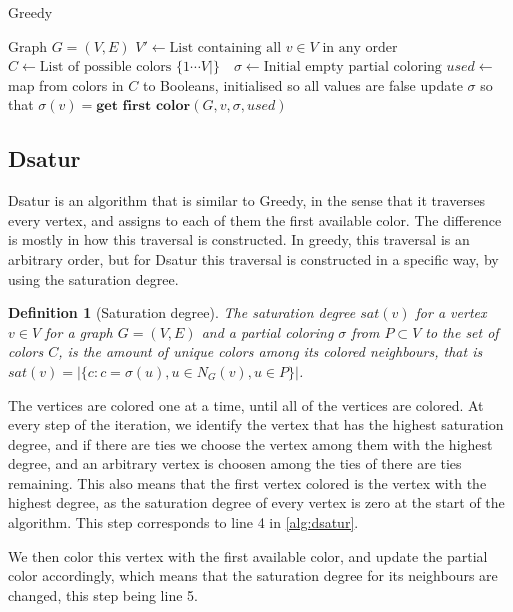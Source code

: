 \documentclass[a4paper]{article}
\newtheorem{definition}{Definition}[section]
\begin{document}
\begin{algorithm}[H]
  \caption{Greedy}
  \label{alg:greedy}
  \begin{algorithmic}[1]
      \REQUIRE Graph $G = (V,E)$
      \STATE $V' \leftarrow \text{List containing all $v \in V$ in any order}$
      \STATE $C \leftarrow \text{List of possible colors $\{1 \cdots V| \}$ }$
      \STATE $\sigma \leftarrow \text{Initial empty partial coloring}$
      \STATE $used \leftarrow $ map from colors in $C$ to Booleans, initialised
      so all values are false
        \STATE update $\sigma$ so that  $\sigma(v) = \textbf{get first color}(G,v,\sigma,used)$
    \ENDFOR
  \end{algorithmic}
\end{algorithm}

\subsection{Dsatur}

Dsatur is an algorithm that is similar to Greedy, in the sense that it
traverses every vertex, and assigns to each of them the first available color.
The difference is mostly in how this traversal is constructed. In greedy, this
traversal is an arbitrary order, but for Dsatur this traversal is constructed
in a specific way, by using the saturation degree.

\begin{definition}[Saturation degree]{\cite{Constructive}}
    The saturation degree $sat(v)$ for a vertex $v \in V$ for a graph $G =
    (V,E)$ and a partial coloring $\sigma$ from $P \subset V$ to the set of colors $C$, is the amount of unique colors among
    its colored neighbours, that is $sat(v) = |\{c  : c = \sigma(u), u \in N_G(v),u \in P  \}|$.
\end{definition}

The vertices are colored one at a time, until all of the vertices are colored.
At every step of the iteration, we identify the vertex that has the highest
saturation degree, and if there are ties we choose the vertex among them with
the highest degree, and an arbitrary vertex is choosen among the ties of there
are ties remaining.  This also means that the first vertex colored is the
vertex with the highest degree, as the saturation degree of every vertex is
zero at the start of the algorithm. This step corresponds to line 4 in 
\autoref{alg:dsatur}.

We then color this vertex with the first available
color, and update the partial color accordingly, which means that the
saturation degree for its neighbours are changed, this step being line 5.
\end{document}
